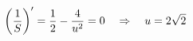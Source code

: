 \documentclass[preview]{standalone}
\begin{document}
\begin{align*}
\special{dvisvgm:raw <g id='unique000'>}\left(\frac1S\right)'=\frac12-\frac4{u^2}=0\quad\Rightarrow\quad u=2\sqrt2\special{dvisvgm:raw </g>}
\end{align*}
\end{document}
